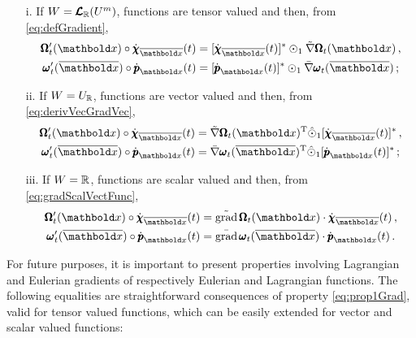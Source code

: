 \begin{itemize}
    \setlength\itemsep{.1em}
    \item[i.] If $W=\pmb{\mathcal{L}}_{\mathbb{R}}(U^m)$, functions are tensor valued and then, from \eqref{eq:defGradient}, 
\begin{equation}
\begin{aligned}
\tnr{\Omega}_t'(\vto{x})\circ\dot{\tnr{\chi}}_{\overline{\vto{x}}}(t)&=[\dot{\tnr{\chi}}_{\overline{\vto{x}}}(t)]^*\odot_1\fua{\tilde{\nabla}\tnr{\Omega}_t}{{\vto{x}}}\,,\\
\tnr{\omega}_t'(\overline{\vto{x}})\circ\dot{\tnr{p}}_{{\vto{x}}}(t)&=[\dot{\tnr{p}}_{{\vto{x}}}(t)]^*\odot_1\fua{\bar{\nabla}\tnr{\omega}_t}{\overline{\vto{x}}}\,;
\end{aligned} 
\end{equation}   
    \item[ii.] If $W=U_{\mathbb{R}}$, functions are vector valued and then, from \eqref{eq:derivVecGradVec},
\begin{equation}\label{eq:compoVector}
\begin{aligned}
\tnr{\Omega}_t'(\vto{x})\circ\dot{\tnr{\chi}}_{\overline{\vto{x}}}(t)&=\fua{\tilde{\nabla}\tnr{\Omega}_t}{{\vto{x}}}^{\text{T}}\hat{\odot}_1[\dot{\tnr{\chi}}_{\overline{\vto{x}}}(t)]^*\,,\\
\tnr{\omega}_t'(\overline{\vto{x}})\circ\dot{\tnr{p}}_{{\vto{x}}}(t)&=\fua{\bar{\nabla}\tnr{\omega}_t}{\overline{\vto{x}}}^{\text{T}}\hat{\odot}_1[\dot{\tnr{p}}_{{\vto{x}}}(t)]^*\,;
\end{aligned} 
\end{equation} 
\item[iii.] If $W=\mathbb{R}$, functions are scalar valued and then, from \eqref{eq:gradScalVectFunc},
\begin{equation}
\begin{aligned}
\tnr{\Omega}_t'(\vto{x})\circ\dot{\tnr{\chi}}_{\overline{\vto{x}}}(t)&=\fua{\tilde{\operatorname{grad}}\,{\tnr{\Omega}_t}}{{\vto{x}}}\cdot\dot{\tnr{\chi}}_{\overline{\vto{x}}}(t)\,,\\
\tnr{\omega}_t'(\overline{\vto{x}})\circ\dot{\tnr{p}}_{{\vto{x}}}(t)&=\fua{\bar{\operatorname{grad}}\,{\tnr{\omega}_t}}{\overline{\vto{x}}}\cdot\dot{\tnr{p}}_{{\vto{x}}}(t)\,.
\end{aligned} 
\end{equation} 
\end{itemize}
For future purposes, it is important to present properties involving Lagrangian and Eulerian gradients of respectively Eulerian and Lagrangian functions. The following equalities are straightforward consequences of property \eqref{eq:prop1Grad}, valid for tensor valued functions, which can be easily extended for vector and scalar valued functions:
